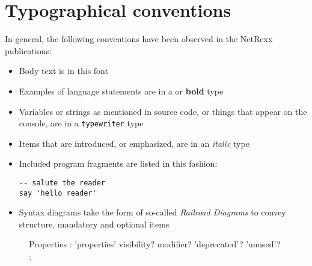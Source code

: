 \chapter{Typographical conventions}
In general, the following conventions have  been observed in the NetRexx publications:
\begin{itemize}
\item Body text is in this font
\item Examples of language statements are in a  or \textbf{bold} type
\item Variables or strings as mentioned in source code, or things that appear on the console, are in a \texttt{typewriter} type
\item Items that are introduced, or emphasized, are in an \emph{italic} type
\item Included program fragments are listed in this fashion:
\begin{lstlisting}[label=example,caption=Example Listing]
-- salute the reader
say 'hello reader'
\end{lstlisting}
\item Syntax diagrams take the form of so-called \emph{Railroad
    Diagrams} to convey structure, mandatory and optional items
  \end{itemize}
 \begin{figure}
 \begin{shaded}
\begin{rail}
Properties : 'properties'   visibility? modifier? 'deprecated'? 'unused'?
               ;
\end{rail}
\end{shaded}
\end{figure}
